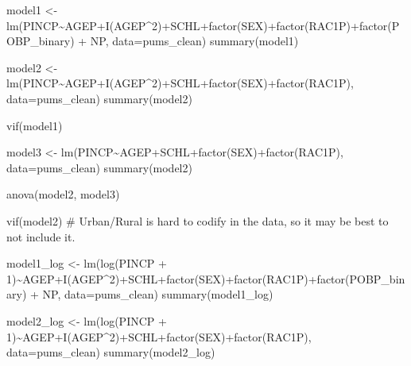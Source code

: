 \documentclass[
  letterpaper,
  DIV=11,
  numbers=noendperiod]{scrartcl}
\newenvironment{Shaded}{\begin{snugshade}}{\end{snugshade}}
\newcommand{\AttributeTok}[1]{\textcolor[rgb]{0.40,0.45,0.13}{#1}}
\newcommand{\CommentTok}[1]{\textcolor[rgb]{0.37,0.37,0.37}{#1}}
\newcommand{\DecValTok}[1]{\textcolor[rgb]{0.68,0.00,0.00}{#1}}
\newcommand{\FunctionTok}[1]{\textcolor[rgb]{0.28,0.35,0.67}{#1}}
\newcommand{\NormalTok}[1]{\textcolor[rgb]{0.00,0.23,0.31}{#1}}
\newcommand{\OtherTok}[1]{\textcolor[rgb]{0.00,0.23,0.31}{#1}}
\newcommand{\SpecialCharTok}[1]{\textcolor[rgb]{0.37,0.37,0.37}{#1}}
\begin{document}
\begin{Shaded}
\begin{Highlighting}[]
\NormalTok{model1 }\OtherTok{\textless{}{-}} \FunctionTok{lm}\NormalTok{(PINCP}\SpecialCharTok{\textasciitilde{}}\NormalTok{AGEP}\SpecialCharTok{+}\FunctionTok{I}\NormalTok{(AGEP}\SpecialCharTok{\^{}}\DecValTok{2}\NormalTok{)}\SpecialCharTok{+}\NormalTok{SCHL}\SpecialCharTok{+}\FunctionTok{factor}\NormalTok{(SEX)}\SpecialCharTok{+}\FunctionTok{factor}\NormalTok{(RAC1P)}\SpecialCharTok{+}\FunctionTok{factor}\NormalTok{(POBP\_binary) }\SpecialCharTok{+}\NormalTok{ NP, }\AttributeTok{data=}\NormalTok{pums\_clean)}
\FunctionTok{summary}\NormalTok{(model1)}

\NormalTok{model2 }\OtherTok{\textless{}{-}} \FunctionTok{lm}\NormalTok{(PINCP}\SpecialCharTok{\textasciitilde{}}\NormalTok{AGEP}\SpecialCharTok{+}\FunctionTok{I}\NormalTok{(AGEP}\SpecialCharTok{\^{}}\DecValTok{2}\NormalTok{)}\SpecialCharTok{+}\NormalTok{SCHL}\SpecialCharTok{+}\FunctionTok{factor}\NormalTok{(SEX)}\SpecialCharTok{+}\FunctionTok{factor}\NormalTok{(RAC1P), }\AttributeTok{data=}\NormalTok{pums\_clean)}
\FunctionTok{summary}\NormalTok{(model2)}

\FunctionTok{vif}\NormalTok{(model1)}

\NormalTok{model3 }\OtherTok{\textless{}{-}} \FunctionTok{lm}\NormalTok{(PINCP}\SpecialCharTok{\textasciitilde{}}\NormalTok{AGEP}\SpecialCharTok{+}\NormalTok{SCHL}\SpecialCharTok{+}\FunctionTok{factor}\NormalTok{(SEX)}\SpecialCharTok{+}\FunctionTok{factor}\NormalTok{(RAC1P), }\AttributeTok{data=}\NormalTok{pums\_clean)}
\FunctionTok{summary}\NormalTok{(model2)}

\FunctionTok{anova}\NormalTok{(model2, model3)}


\FunctionTok{vif}\NormalTok{(model2)}
\CommentTok{\# Urban/Rural is hard to codify in the data, so it may be best to not include it.}

\NormalTok{model1\_log }\OtherTok{\textless{}{-}} \FunctionTok{lm}\NormalTok{(}\FunctionTok{log}\NormalTok{(PINCP }\SpecialCharTok{+} \DecValTok{1}\NormalTok{)}\SpecialCharTok{\textasciitilde{}}\NormalTok{AGEP}\SpecialCharTok{+}\FunctionTok{I}\NormalTok{(AGEP}\SpecialCharTok{\^{}}\DecValTok{2}\NormalTok{)}\SpecialCharTok{+}\NormalTok{SCHL}\SpecialCharTok{+}\FunctionTok{factor}\NormalTok{(SEX)}\SpecialCharTok{+}\FunctionTok{factor}\NormalTok{(RAC1P)}\SpecialCharTok{+}\FunctionTok{factor}\NormalTok{(POBP\_binary) }\SpecialCharTok{+}\NormalTok{ NP, }\AttributeTok{data=}\NormalTok{pums\_clean)}
\FunctionTok{summary}\NormalTok{(model1\_log)}

\NormalTok{model2\_log }\OtherTok{\textless{}{-}} \FunctionTok{lm}\NormalTok{(}\FunctionTok{log}\NormalTok{(PINCP }\SpecialCharTok{+} \DecValTok{1}\NormalTok{)}\SpecialCharTok{\textasciitilde{}}\NormalTok{AGEP}\SpecialCharTok{+}\FunctionTok{I}\NormalTok{(AGEP}\SpecialCharTok{\^{}}\DecValTok{2}\NormalTok{)}\SpecialCharTok{+}\NormalTok{SCHL}\SpecialCharTok{+}\FunctionTok{factor}\NormalTok{(SEX)}\SpecialCharTok{+}\FunctionTok{factor}\NormalTok{(RAC1P), }\AttributeTok{data=}\NormalTok{pums\_clean)}
\FunctionTok{summary}\NormalTok{(model2\_log)}


\end{Highlighting}
\end{Shaded}
\end{document}
